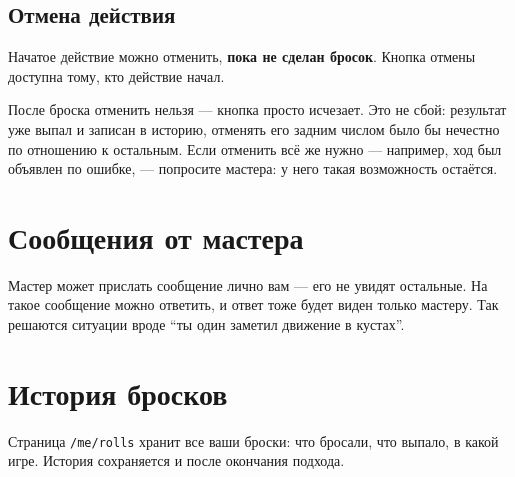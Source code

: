 \subsection{Отмена действия}
\label{sec:player:cancel}

Начатое действие можно отменить, \textbf{пока не сделан бросок}. Кнопка отмены доступна тому, кто действие начал.

После броска отменить нельзя --- кнопка просто исчезает. Это не сбой: результат уже выпал и записан в историю, отменять его задним числом было бы нечестно по отношению к остальным. Если отменить всё же нужно --- например, ход был объявлен по ошибке, --- попросите мастера: у него такая возможность остаётся.

\section{Сообщения от мастера}
\label{sec:player:messages}

Мастер может прислать сообщение лично вам --- его не увидят остальные. На такое сообщение можно ответить, и ответ тоже будет виден только мастеру. Так решаются ситуации вроде ``ты один заметил движение в кустах''.

\section{История бросков}
\label{sec:player:rolls}

Страница \texttt{/me/rolls} хранит все ваши броски: что бросали, что выпало, в какой игре. История сохраняется и после окончания подхода.
